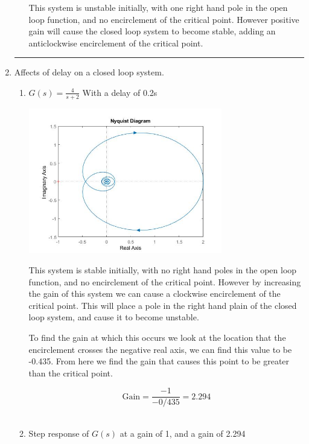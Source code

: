 \documentclass[a4paper,11pt]{article}
\begin{document}
\begin{preview}
\begin{enumerate}
\begin{enumerate}
      This system is unstable initially, with one right hand pole in the open loop function, and no encirclement of the critical point. However positive gain will cause the closed loop system to become stable, adding an anticlockwise encirclement of the critical point.\\
    \end{enumerate}


\hrule

\item Affects of delay on a closed loop system.

\begin{enumerate}
  
  \item $ G(s) = \frac{4}{s+2} $ With a delay of 0.2s
  
  \begin{center}
    \includegraphics[width=0.7\textwidth]{A_1/2_a_nyquist.jpg}
  \end{center}

  This system is stable initially, with no right hand poles in the open loop function, and no encirclement of the critical point. However by increasing the gain of this system we can cause a clockwise encirclement of the critical point. This will place a pole in the right hand plain of the closed loop system, and cause it to become unstable. 

  To find the gain at which this occurs we look at the location that the encirclement crosses the negative real axis, we can find this value to be -0.435. From here we find the gain that causes this point to be greater than the critical point. 

  $$ \mathrm{Gain} = \frac{-1}{-0/435} = 2.294$$\\


  \item Step response of $G(s)$ at a gain of 1, and a gain of 2.294


\end{enumerate}
\end{enumerate}
\end{preview}
\end{document}
